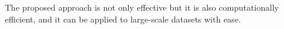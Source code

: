 The proposed approach is not only effective but it is also computationally efficient, and it can be applied to large-scale datasets with ease.
